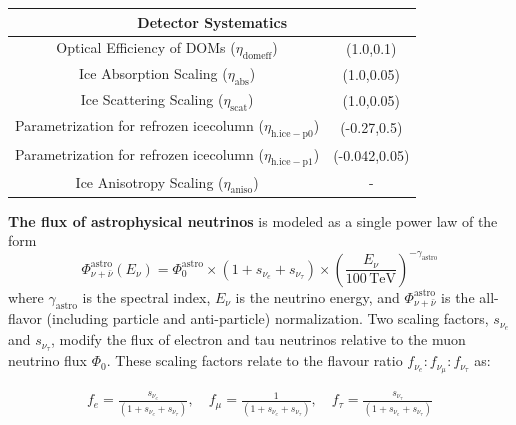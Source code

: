\begin{table}[h]
\begin{tabular}{ |c |c|}
        \multicolumn{2}{c}{\textbf{Detector Systematics}}\\
        \hline
        Optical Efficiency of DOMs ($\eta_{\mathrm{domeff}}$) & (1.0,0.1)\\
        Ice Absorption Scaling ($\eta_{\mathrm{abs}}$)  & (1.0,0.05)\\
        Ice Scattering Scaling ($\eta_{\mathrm{scat}}$) & (1.0,0.05)\\
        Parametrization for refrozen icecolumn ($\eta_{\mathrm{h.ice-p0}}$)  & (-0.27,0.5)\\
        Parametrization for refrozen icecolumn ($\eta_{\mathrm{h.ice-p1}}$) & (-0.042,0.05)\\
        Ice Anisotropy Scaling ($\eta_{\mathrm{aniso}}$) &  -\\
        \hline
        \hline
    \end{tabular}
    
\end{table}

\textbf{The flux of astrophysical neutrinos} is modeled as a single power law of the form
\begin{equation}\label{eq:SPL}
\Phi_{\nu + \bar{\nu}}^{\mathrm{astro}}(E_{\nu}) = \Phi_{\mathrm{0}}^{\mathrm{astro}} \times 
    (1 + s_{\nu_{e}} + s_{\nu_{\tau}}) \times
    \left( \frac{E_\nu}{\mathrm{100\,TeV}} \right)^{-\gamma_{\mathrm{astro}}}
\end{equation}
where $\gamma_{\mathrm{astro}}$ is the spectral index, $E_\nu$ is the neutrino energy, and $\Phi_{\nu + \bar{\nu}}^{\mathrm{astro}}$ is the all-flavor (including particle and anti-particle) normalization. Two scaling factors, $s_{\nu_{e}}$ and $s_{\nu_{\tau}}$, modify the flux of electron and tau neutrinos relative to the muon neutrino flux $\Phi_{\mathrm{0}}$. These scaling factors relate to the flavour ratio $f_{\nu_e}:f_{\nu_{\mu}}:f_{\nu_{\tau}}$ as:

\begin{equation}\label{eq:flav_frac}
    \begin{array}{rcl}
        f_{e} = \frac{s_{\nu_{e}}}{(1 + s_{\nu_{e}} + s_{\nu_{\tau}})}, \quad
        f_{\mu} = \frac{1}{(1 + s_{\nu_{e}} + s_{\nu_{\tau}})}, \quad
        f_{\tau} = \frac{s_{\nu_{\tau}}}{(1 + s_{\nu_{e}} + s_{\nu_{\tau}})}
    \end{array}
\end{equation}

